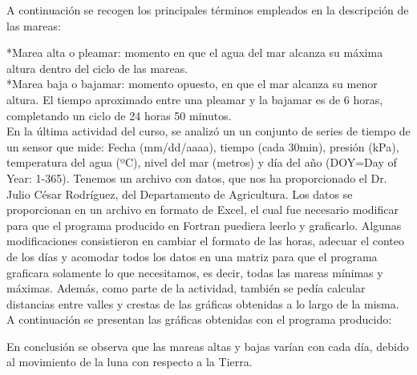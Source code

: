 \documentclass[12pt]{article}
\begin{document}
A continuación se recogen los principales términos empleados en la descripción de las mareas:

*Marea alta o pleamar: momento en que el agua del mar alcanza su máxima altura dentro del ciclo de las mareas.\\
*Marea baja o bajamar: momento opuesto, en que el mar alcanza su menor altura.
El tiempo aproximado entre una pleamar y la bajamar es de 6 horas, completando un ciclo de 24 horas 50 minutos.\\
En la última actividad del curso, se analizó un un conjunto de series de tiempo de un sensor que mide: Fecha (mm/dd/aaaa), tiempo (cada 30min), presión (kPa), temperatura del agua (ºC), nivel del mar (metros) y día del año (DOY=Day of Year: 1-365). Tenemos un archivo con datos, que nos ha proporcionado el Dr. Julio César Rodríguez, del Departamento de Agricultura. Los datos se proporcionan en un archivo en formato de Excel, el cual fue necesario modificar para que el programa producido en Fortran puediera leerlo y graficarlo.
Algunas modificaciones consistieron en cambiar el formato de las horas, adecuar el conteo de los días y acomodar todos los datos en una  matriz para que el programa graficara solamente lo que necesitamos, es decir, todas las mareas mínimas y máximas.
Además, como parte de la actividad, también se pedía calcular distancias entre valles y crestas de las gráficas obtenidas a lo largo de la misma.\\

A continuación se presentan las gráficas obtenidas con el programa producido:

En conclusión se observa que las mareas altas y bajas varían con cada día, debido al movimiento de la luna con respecto a la Tierra. 
\end{document}
